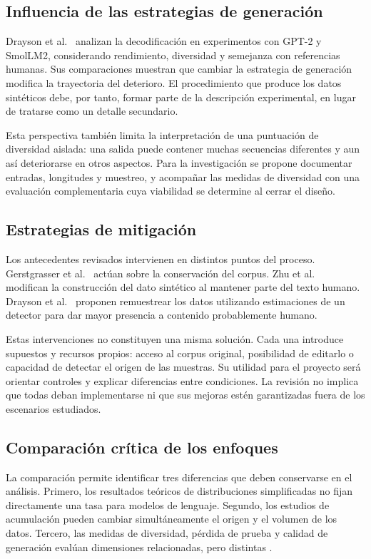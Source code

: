 \documentclass[12pt,letterpaper]{article}
\begin{document}
\subsection{Influencia de las estrategias de generación}

Drayson et al.\ \cite{drayson2025} analizan la decodificación en experimentos
con GPT-2 y SmolLM2, considerando rendimiento, diversidad y semejanza con
referencias humanas. Sus comparaciones muestran que cambiar la estrategia
de generación modifica la trayectoria del deterioro. El procedimiento
que produce los datos sintéticos debe, por tanto, formar parte de la
descripción experimental, en lugar de tratarse como un detalle secundario.

Esta perspectiva también limita la interpretación de una puntuación de
diversidad aislada: una salida puede contener muchas secuencias diferentes
y aun así deteriorarse en otros aspectos. Para la investigación se propone
documentar entradas, longitudes y muestreo, y acompañar las medidas de
diversidad con una evaluación complementaria cuya viabilidad se determine
al cerrar el diseño.

\subsection{Estrategias de mitigación}

Los antecedentes revisados intervienen en distintos puntos del proceso.
Gerstgrasser et al.\ \cite{gerstgrasser2024} actúan sobre la conservación
del corpus. Zhu et al.\ \cite{zhu2025} modifican la construcción del dato
sintético al mantener parte del texto humano. Drayson et al.\
\cite{drayson2025} proponen remuestrear los datos utilizando estimaciones
de un detector para dar mayor presencia a contenido probablemente humano.

Estas intervenciones no constituyen una misma solución. Cada una introduce
supuestos y recursos propios: acceso al corpus original, posibilidad de
editarlo o capacidad de detectar el origen de las muestras. Su utilidad
para el proyecto será orientar controles y explicar diferencias entre
condiciones. La revisión no implica que todas deban implementarse ni que
sus mejoras estén garantizadas fuera de los escenarios estudiados.

\subsection{Comparación crítica de los enfoques}

La comparación permite identificar tres diferencias que deben conservarse
en el análisis. Primero, los resultados teóricos de distribuciones
simplificadas no fijan directamente una tasa para modelos de lenguaje.
Segundo, los estudios de acumulación pueden cambiar simultáneamente el
origen y el volumen de los datos. Tercero, las medidas de diversidad,
pérdida de prueba y calidad de generación evalúan dimensiones relacionadas,
pero distintas \cite{suresh2025,kazdan2025,guo2024,drayson2025}.
\end{document}
